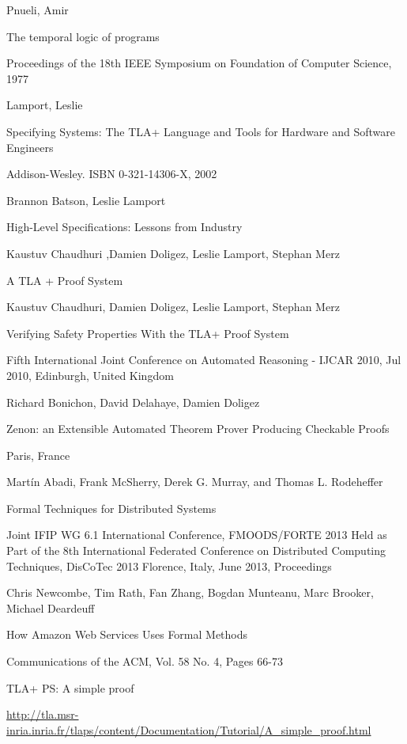 \documentclass[spanish]{llncs}
\begin{document}
%
%
\begin{thebibliography}{5}
%
Pnueli, Amir

The temporal logic of programs

Proceedings of the 18th IEEE Symposium on Foundation of Computer Science, 1977

Lamport, Leslie

Specifying Systems: The TLA+ Language and Tools for Hardware and Software Engineers

Addison-Wesley. ISBN 0-321-14306-X, 2002

Brannon Batson, Leslie Lamport

High-Level Specifications: Lessons from Industry

Kaustuv Chaudhuri ,Damien Doligez, Leslie Lamport, Stephan Merz

A TLA + Proof System

Kaustuv Chaudhuri, Damien Doligez, Leslie Lamport, Stephan Merz

Verifying Safety Properties With the TLA+ Proof System

Fifth International Joint Conference on Automated Reasoning - IJCAR 2010, Jul 2010, Edinburgh, United Kingdom

Richard Bonichon, David Delahaye, Damien Doligez

Zenon: an Extensible Automated Theorem Prover Producing Checkable Proofs

Paris, France

Martín Abadi, Frank McSherry, Derek G. Murray, and Thomas L. Rodeheffer

Formal Techniques for Distributed Systems

Joint IFIP WG 6.1 International Conference, FMOODS/FORTE 2013
Held as Part of the 8th International Federated Conference
on Distributed Computing Techniques, DisCoTec 2013
Florence, Italy, June 2013, Proceedings

Chris Newcombe, Tim Rath, Fan Zhang, Bogdan Munteanu, Marc Brooker, Michael Deardeuff 

How Amazon Web Services Uses Formal Methods

Communications of the ACM, Vol. 58 No. 4, Pages 66-73

TLA+ PS: A simple proof

\url{http://tla.msr-inria.inria.fr/tlaps/content/Documentation/Tutorial/A_simple_proof.html}


\end{thebibliography}
\end{document}

